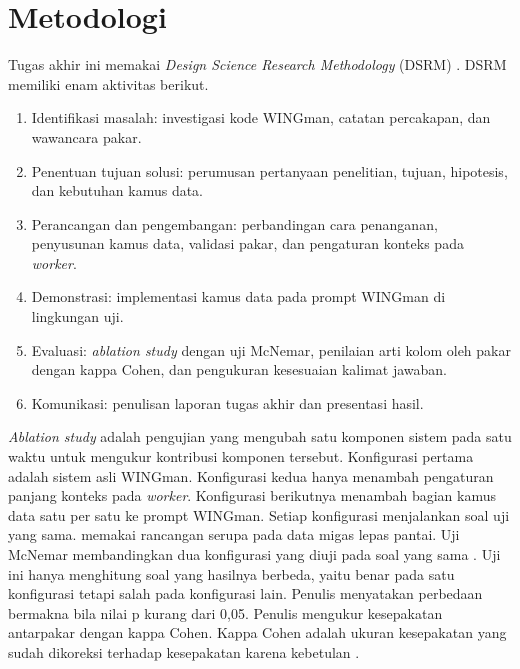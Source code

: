 \section{Metodologi}
Tugas akhir ini memakai \emph{Design Science Research Methodology} (DSRM) \autocite{peffers2007design}. DSRM memiliki enam aktivitas berikut.

\begin{enumerate}
\item	Identifikasi masalah: investigasi kode WINGman, catatan percakapan, dan wawancara pakar.
\item	Penentuan tujuan solusi: perumusan pertanyaan penelitian, tujuan, hipotesis, dan kebutuhan kamus data.
\item	Perancangan dan pengembangan: perbandingan cara penanganan, penyusunan kamus data, validasi pakar, dan pengaturan konteks pada \emph{worker}.
\item	Demonstrasi: implementasi kamus data pada prompt WINGman di lingkungan uji.
\item	Evaluasi: \emph{ablation study} dengan uji McNemar, penilaian arti kolom oleh pakar dengan kappa Cohen, dan pengukuran kesesuaian kalimat jawaban.
\item	Komunikasi: penulisan laporan tugas akhir dan presentasi hasil.
\end{enumerate}

\emph{Ablation study} adalah pengujian yang mengubah satu komponen sistem pada satu waktu untuk mengukur kontribusi komponen tersebut. Konfigurasi pertama adalah sistem asli WINGman. Konfigurasi kedua hanya menambah pengaturan panjang konteks pada \emph{worker}. Konfigurasi berikutnya menambah bagian kamus data satu per satu ke prompt WINGman. Setiap konfigurasi menjalankan soal uji yang sama. \textcite{macedo2026twolayer} memakai rancangan serupa pada data migas lepas pantai. Uji McNemar membandingkan dua konfigurasi yang diuji pada soal yang sama \autocite{dietterich1998approximate}. Uji ini hanya menghitung soal yang hasilnya berbeda, yaitu benar pada satu konfigurasi tetapi salah pada konfigurasi lain. Penulis menyatakan perbedaan bermakna bila nilai p kurang dari 0,05. Penulis mengukur kesepakatan antarpakar dengan kappa Cohen. Kappa Cohen adalah ukuran kesepakatan yang sudah dikoreksi terhadap kesepakatan karena kebetulan \autocite{cohen1960coefficient}.

